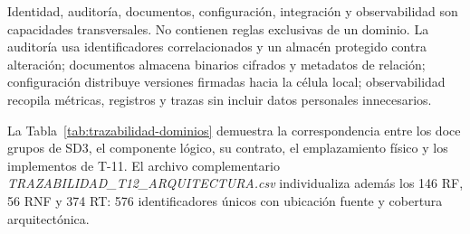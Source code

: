 \documentclass[11pt,letterpaper]{report}
\begin{document}
Identidad, auditoría, documentos, configuración, integración y observabilidad son capacidades transversales. No contienen reglas exclusivas de un dominio. La auditoría usa identificadores correlacionados y un almacén protegido contra alteración; documentos almacena binarios cifrados y metadatos de relación; configuración distribuye versiones firmadas hacia la célula local; observabilidad recopila métricas, registros y trazas sin incluir datos personales innecesarios.

La Tabla~\ref{tab:trazabilidad-dominios} demuestra la correspondencia entre los doce grupos de SD3, el componente lógico, su contrato, el emplazamiento físico y los implementos de T-11. El archivo complementario \textit{TRAZABILIDAD\_T12\_ARQUITECTURA.csv} individualiza además los 146 RF, 56 RNF y 374 RT: 576 identificadores únicos con ubicación fuente y cobertura arquitectónica.
\end{document}
